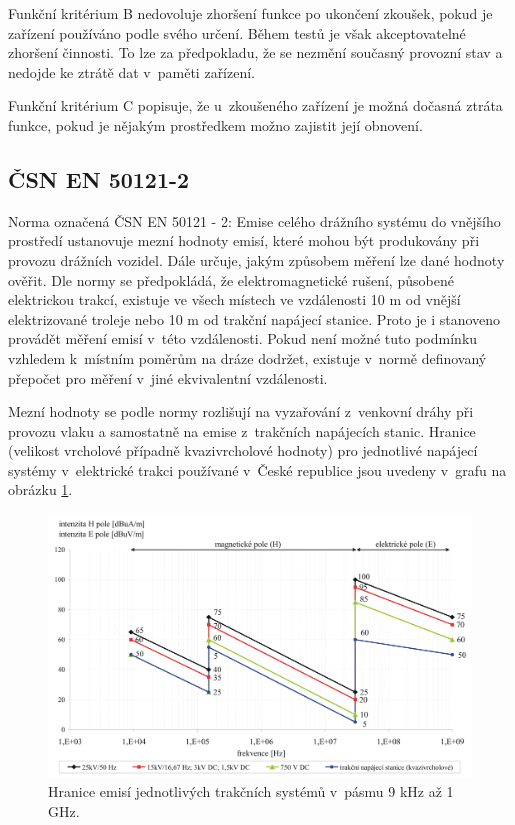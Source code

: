 Funkční kritérium B nedovoluje zhoršení funkce po ukončení zkoušek, pokud je zařízení používáno podle svého určení. Během testů je však akceptovatelné zhoršení činnosti. To lze za předpokladu, že se nezmění současný provozní stav a nedojde ke ztrátě dat v~paměti zařízení.

Funkční kritérium C popisuje, že u~zkoušeného zařízení je možná dočasná ztráta funkce, pokud je nějakým prostředkem možno zajistit její obnovení.

\subsection{ČSN EN 50121-2}
Norma označená ČSN EN 50121 - 2: Emise celého drážního  systému do vnějšího prostředí ustanovuje mezní hodnoty emisí, které mohou být produkovány při provozu drážních vozidel. Dále určuje, jakým způsobem měření lze dané hodnoty ověřit. Dle normy se předpokládá, že elektromagnetické rušení, působené elektrickou trakcí, existuje ve všech místech ve vzdálenosti 10 m od vnější elektrizované troleje nebo 10 m od trakční napájecí stanice. Proto je i stanoveno provádět měření emisí v~této vzdálenosti. Pokud není možné tuto podmínku vzhledem k~místním poměrům na dráze dodržet, existuje v~normě definovaný přepočet pro měření v~jiné ekvivalentní vzdálenosti. 

Mezní hodnoty se podle normy rozlišují na vyzařování z~venkovní dráhy při provozu vlaku a samostatně na emise z~trakčních napájecích stanic. Hranice (velikost vrcholové případně kvazivrcholové hodnoty) pro jednotlivé napájecí systémy v~elektrické trakci používané v~České republice jsou uvedeny v~grafu na obrázku \ref{obr:emc_emise}.

\begin{figure}[!h]
	\centering
	\includegraphics[width=12cm]{emc_emise.png}
	\caption{Hranice emisí jednotlivých trakčních systémů v~pásmu 9 kHz až 1 GHz.}
	\label{obr:emc_emise}
\end{figure}

